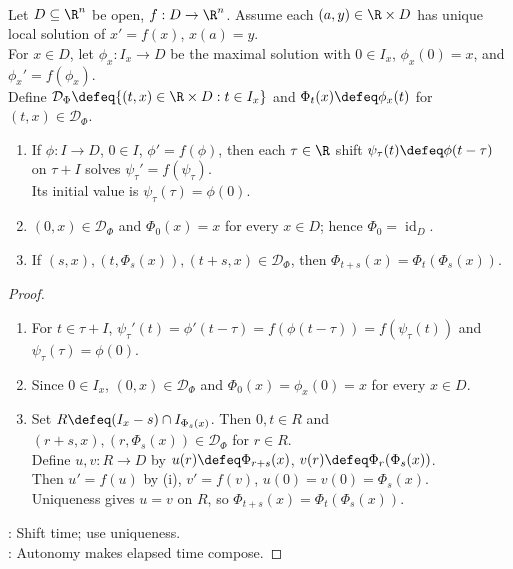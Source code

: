 \begin{proposition} \label{prop:autonomous-time-translation-flow-law} \\
Let $D\subseteq\R^n$ be open, $f:D\to\R^n$. Assume each $(a,y)\in\R\times D$ has unique local solution of $x'=f(x)$, $x(a)=y$.\\
For $x\in D$, let $\phi_x:I_x\to D$ be the maximal solution with $0\in I_x$, $\phi_x(0)=x$, and $\phi_x'=f(\phi_x)$.\\
Define $\mathcal D_\Phi\defeq\{(t,x)\in\R\times D:t\in I_x\}$ and $\Phi_t(x)\defeq\phi_x(t)$ for $(t,x)\in\mathcal D_\Phi$.
\begin{enumerate}[label=(\roman*)]
\setlength{\itemsep}{0pt}
\item If $\phi:I\to D$, $0\in I$, $\phi'=f(\phi)$, then each $\tau\in\R$ shift $\psi_\tau(t)\defeq\phi(t-\tau)$ on $\tau+I$ solves $\psi_\tau'=f(\psi_\tau)$.\\
Its initial value is $\psi_\tau(\tau)=\phi(0)$.
\item $(0,x)\in\mathcal D_\Phi$ and $\Phi_0(x)=x$ for every $x\in D$; hence $\Phi_0=\operatorname{id}_D$.
\item If $(s,x),(t,\Phi_s(x)),(t+s,x)\in\mathcal D_\Phi$, then $\Phi_{t+s}(x)=\Phi_t(\Phi_s(x))$.
\end{enumerate}
\begin{proof}
\begin{enumerate}[label=(\roman*)]
\setlength{\itemsep}{0pt}
\item For $t\in\tau+I$, $\psi_\tau'(t)=\phi'(t-\tau)=f(\phi(t-\tau))=f(\psi_\tau(t))$ and $\psi_\tau(\tau)=\phi(0)$.
\item Since $0\in I_x$, $(0,x)\in\mathcal D_\Phi$ and $\Phi_0(x)=\phi_x(0)=x$ for every $x\in D$.
\item Set $R\defeq(I_x-s)\cap I_{\Phi_s(x)}$. Then $0,t\in R$ and $(r+s,x),(r,\Phi_s(x))\in\mathcal D_\Phi$ for $r\in R$.\\
Define $u,v:R\to D$ by $u(r)\defeq\Phi_{r+s}(x)$, $v(r)\defeq\Phi_r(\Phi_s(x))$.\\
Then $u'=f(u)$ by (i), $v'=f(v)$, $u(0)=v(0)=\Phi_s(x)$.\\
Uniqueness gives $u=v$ on $R$, so $\Phi_{t+s}(x)=\Phi_t(\Phi_s(x))$.
\end{enumerate}
: Shift time; use uniqueness.\\
: Autonomy makes elapsed time compose.
\end{proof}
\end{proposition}
